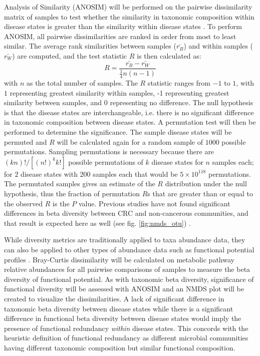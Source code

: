 \documentclass[11pt]{article}
\begin{document}
Analysis of Similarity (ANOSIM) will be performed on the pairwise dissimilarity matrix of samples to test whether the similarity in taxonomic composition within disease states is greater than the similarity within disease states \cite{clarke_non-parametric_1993}.
To perform ANOSIM, all pairwise dissimilarities are ranked in order from most to least similar.
The average rank similarities between samples ($\bar{r_B}$) and within samples ($\bar{r_W}$) are computed, and the test statistic $R$ is then calculated as:
$$R = \frac{ \bar{r_B} - \bar{r_W} }{ \frac{1}{4} n(n-1) }$$
with $n$ as the total number of samples.
The $R$ statistic ranges from $-1$ to $1$, with $1$ representing greatest similarity within samples, -1 representing greatest similarity between samples, and $0$ representing no difference.
The null hypothesis is that the disease states are interchangeable, i.e. there is no significant difference in taxonomic composition between disease states.
A permutation test will then be performed to determine the significance.
The sample disease states will be permuted and $R$ will be calculated again for a random sample of $1000$ possible permutations.
Sampling permutations is necessary because there are $(kn)!/[(n!)^k k!]$ possible permutations of $k$ disease states for $n$ samples each;
for $2$ disease states with $200$ samples each that would be $5 \times 10^{118}$ permutations.
The permutated samples gives an estimate of the $R$ distribution under the null hypothesis,
thus the fraction of permutation $R$s that are greater than or equal to the observed $R$ is the $P$ value.
Previous studies have not found significant differences in beta diversity between CRC and non-cancerous communities, and that result is expected here as well (see fig. \ref{fig:nmds_otu}) \cite{weir_stool_2013, hannigan_diagnostic_2018, topcuoglu_framework_2020}.

While diversity metrics are traditionally applied to taxa abundance data,
they can also be applied to other types of abundance data such as functional potential profiles \cite{franzosa_species-level_2018}.
Bray-Curtis dissimilarity will be calculated on metabolic pathway relative abundances for all pairwise comparisons of samples to measure the beta diversity of functional potential.
As with taxonomic beta diversity, significance of functional diversity will be assessed with ANOSIM and an NMDS plot will be created to visualize the dissimilarities.
A lack of significant difference in taxonomic beta diversity between disease states
while there is a significant difference in functional beta diversity between disease states
would imply the presence of functional redundancy \textit{within} disease states.
This concords with the heuristic definition of functional redundancy as different microbial communities having different taxonomic composition but similar functional composition.
\end{document}
